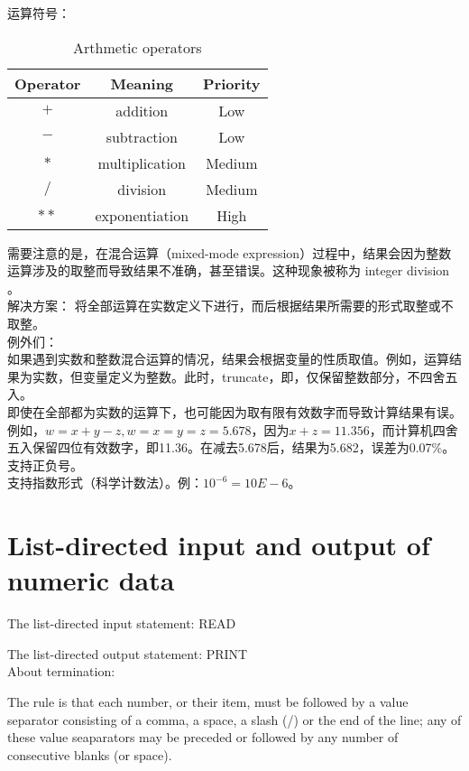 \documentclass[a4paper,titlepage]{report}
\theoremstyle{definition}
\begin{document}
\noindent 运算符号：
\begin{table}[H]
\centering
\begin{tabular}{ccc}
Operator & Meaning & Priority \\
\hline
$+$ & addition & Low  \\
$-$ & subtraction & Low  \\
$*$ & multiplication & Medium  \\
$/$ & division & Medium  \\
$**$ & exponentiation & High \\
\hline 
\end{tabular}
\caption{Arthmetic operators}
\label{table:MyTableLabel}
\end{table}

需要注意的是，在混合运算（mixed-mode expression）过程中，结果会因为整数运算涉及的取整而导致结果不准确，甚至错误。这种现象被称为 integer division 。 \\

解决方案： 将全部运算在实数定义下进行，而后根据结果所需要的形式取整或不取整。 \\

\noindent 例外们：\\

如果遇到实数和整数混合运算的情况，结果会根据变量的性质取值。例如，运算结果为实数，但变量定义为整数。此时，truncate，即，仅保留整数部分，不四舍五入。 \\

即使在全部都为实数的运算下，也可能因为取有限有效数字而导致计算结果有误。例如，$w=x+y-z, w=x=y=z=5.678$，因为$x+z=11.356$，而计算机四舍五入保留四位有效数字，即11.36。在减去5.678后，结果为5.682，误差为0.07\%。 \\

支持正负号。 \\

支持指数形式（科学计数法）。例：$10^{-6} = 10E-6$。

\section{List-directed input and output of numeric data}

The list-directed input statement: READ \par
The list-directed output statement: PRINT \\

\noindent About termination: \par
The rule is that each number, or their item, must be followed by a value separator consisting of a comma, a space, a slash (/) or the end of the line; any of these value seaparators may be preceded or followed by any number of consecutive blanks (or space).
\end{document}

